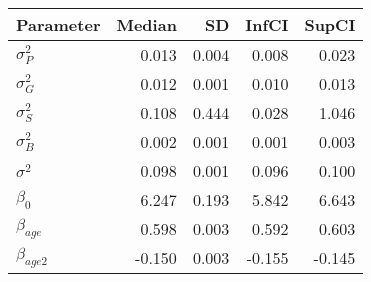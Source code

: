 \begin{table}[ht]
\centering
\begin{tabular}{lrrrr}
  \hline
Parameter & Median & SD & InfCI & SupCI \\ 
  \hline
$\sigma^{2}_{P}$ & 0.013 & 0.004 & 0.008 & 0.023 \\ 
  $\sigma^{2}_{G}$ & 0.012 & 0.001 & 0.010 & 0.013 \\ 
  $\sigma^{2}_{S}$ & 0.108 & 0.444 & 0.028 & 1.046 \\ 
  $\sigma^{2}_{B}$ & 0.002 & 0.001 & 0.001 & 0.003 \\ 
  $\sigma^{2}$ & 0.098 & 0.001 & 0.096 & 0.100 \\ 
  $\beta_{0}$ & 6.247 & 0.193 & 5.842 & 6.643 \\ 
  $\beta_{age}$ & 0.598 & 0.003 & 0.592 & 0.603 \\ 
  $\beta_{age2}$ & -0.150 & 0.003 & -0.155 & -0.145 \\ 
   \hline
\end{tabular}
\end{table}
